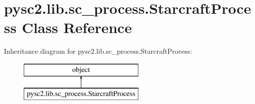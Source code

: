 \hypertarget{classpysc2_1_1lib_1_1sc__process_1_1_starcraft_process}{}\section{pysc2.\+lib.\+sc\+\_\+process.\+Starcraft\+Process Class Reference}
\label{classpysc2_1_1lib_1_1sc__process_1_1_starcraft_process}
Inheritance diagram for pysc2.\+lib.\+sc\+\_\+process.\+Starcraft\+Process\+:\begin{figure}[H]
\begin{center}
\leavevmode
\includegraphics[height=2.000000cm]{classpysc2_1_1lib_1_1sc__process_1_1_starcraft_process}
\end{center}
\end{figure}
